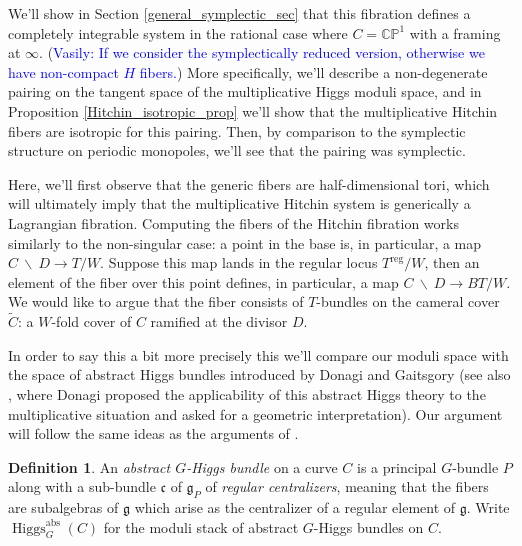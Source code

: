 \documentclass[11pt, oneside, reqno]{amsart}
\theoremstyle{definition} \newtheorem{definition}{Definition}[section]
\theoremstyle{definition} \newtheorem{remark}[definition]{Remark}
\theoremstyle{definition} \newtheorem{remarks}[definition]{Remarks}
\theoremstyle{definition} \newtheorem{question}[definition]{Question}
\theoremstyle{definition} \newtheorem*{note}{Note}
\theoremstyle{definition} \newtheorem{example}[definition]{Example}
\theoremstyle{definition} \newtheorem{examples}[definition]{Examples}
\renewcommand{\gg}{\mathfrak{g}}
\newcommand{\bb}[1]{\mathbb{#1}}
\newcommand{\mr}[1]{\mathrm{#1}}
\newcommand{\mf}[1]{\mathfrak{#1}}
\newcommand{\wt}[1]{\widetilde{#1}}
\newcommand{\bs}{\ \backslash \ }
\DeclareMathOperator{\higgs}{Higgs}
\newcommand{\vasily}[1]{(\textcolor{blue}{Vasily: #1})}
\begin{document}
We'll show in Section \ref{general_symplectic_sec} that this fibration defines a completely integrable system in the rational case where $C = \bb{CP}^1$ with a framing at $\infty$.  \vasily{If we consider the symplectically
  reduced version, otherwise we have non-compact $H$ fibers.} 
More specifically, we'll describe a non-degenerate pairing on the tangent space of the multiplicative Higgs moduli space, and in Proposition \ref{Hitchin_isotropic_prop} we'll show that the multiplicative Hitchin fibers are isotropic for this pairing.  Then, by comparison to the symplectic structure on periodic monopoles, we'll see that the pairing was symplectic.

Here, we'll first observe that the generic fibers are half-dimensional tori, which will ultimately imply that the multiplicative Hitchin system is generically a Lagrangian fibration.  Computing the fibers of the Hitchin fibration works similarly to the non-singular case: a point in the base is, in particular, a map $C \bs D \to T/W$.  Suppose this map lands in the regular locus $T^{\mr{reg}}/W$, then an element of the fiber over this point defines, in particular, a map $C \bs D \to BT/W$.  We would like to argue that the fiber consists of $T$-bundles on the cameral cover $\wt C$: a $W$-fold cover of $C$ ramified at the divisor $D$.

In order to say this a bit more precisely this we'll compare our moduli space with the space of abstract Higgs bundles introduced by Donagi and Gaitsgory \cite{DonagiGaitsgory} (see also \cite{DonagiLectures}, where Donagi proposed the applicability of this abstract Higgs theory to the multiplicative situation and asked for a geometric interpretation).  Our argument will follow the same ideas as the arguments of \cite[Section 6]{HurtubiseMarkman}.

\begin{definition}
An \emph{abstract $G$-Higgs bundle} on a curve $C$ is a principal $G$-bundle $P$ along with a sub-bundle $\mf c$ of $\gg_P$ of \emph{regular centralizers}, meaning that the fibers are subalgebras of $\gg$ which arise as the centralizer of a regular element of $\gg$.  Write $\higgs_G^{\mr{abs}}(C)$ for the moduli stack of abstract $G$-Higgs bundles on $C$.
\end{definition}
\end{document}
